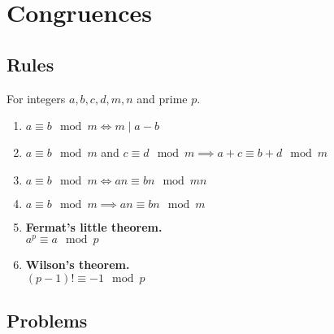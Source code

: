 \documentclass{article}
\begin{document}
\newpage
\section{Congruences}
\subsection{Rules}
For integers $a,b,c,d,m,n$ and prime $p$.
\begin{enumerate}
	\item 
	$a \equiv b \mod m \iff m \mid a-b $
	\item 
	$a\equiv b \mod m$ and $ c\equiv d \mod m \implies a+c\equiv b+d \mod m$	
	\item 
	$a \equiv b \mod m \iff an \equiv bn \mod mn$
	\item 
	$a \equiv b \mod m \implies an \equiv bn \mod m$
	\item
	\textbf{Fermat's little theorem.} \\
	$a^p \equiv a \mod p$
	\item 
	\textbf{Wilson's theorem.} \\
	$(p-1)!\equiv -1 \mod p$
	
	
\end{enumerate}

\subsection{Problems}
\end{document}
